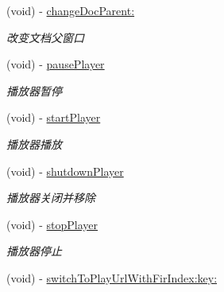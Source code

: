 \begin{DoxyCompactItemize}
\mbox{\label{interface_request_data_a37719945b113eff0941f5a1212ae9216}} 
(void) -\/ \hyperlink{interface_request_data_a37719945b113eff0941f5a1212ae9216}{change\+Doc\+Parent\+:}
\begin{DoxyCompactList}\small\item\em 改变文档父窗口 \end{DoxyCompactList}\item 
\mbox{\label{interface_request_data_afa31c9712b6356fcaee24267d43863e3}} 
(void) -\/ \hyperlink{interface_request_data_afa31c9712b6356fcaee24267d43863e3}{pause\+Player}
\begin{DoxyCompactList}\small\item\em 播放器暂停 \end{DoxyCompactList}\item 
\mbox{\label{interface_request_data_a26f668c79f901d70090f4d25f925e62f}} 
(void) -\/ \hyperlink{interface_request_data_a26f668c79f901d70090f4d25f925e62f}{start\+Player}
\begin{DoxyCompactList}\small\item\em 播放器播放 \end{DoxyCompactList}\item 
\mbox{\label{interface_request_data_a5fa79092e740b86134c113e8f1beea22}} 
(void) -\/ \hyperlink{interface_request_data_a5fa79092e740b86134c113e8f1beea22}{shutdown\+Player}
\begin{DoxyCompactList}\small\item\em 播放器关闭并移除 \end{DoxyCompactList}\item 
\mbox{\label{interface_request_data_ae509e7097cd3ddfad8f0b81dd51eff33}} 
(void) -\/ \hyperlink{interface_request_data_ae509e7097cd3ddfad8f0b81dd51eff33}{stop\+Player}
\begin{DoxyCompactList}\small\item\em 播放器停止 \end{DoxyCompactList}\item 
\mbox{\label{interface_request_data_a614c0a62c3d2bb301473c91c3a5a2991}} 
(void) -\/ \hyperlink{interface_request_data_a614c0a62c3d2bb301473c91c3a5a2991}{switch\+To\+Play\+Url\+With\+Fir\+Index\+:key\+:}

\end{DoxyCompactItemize}
